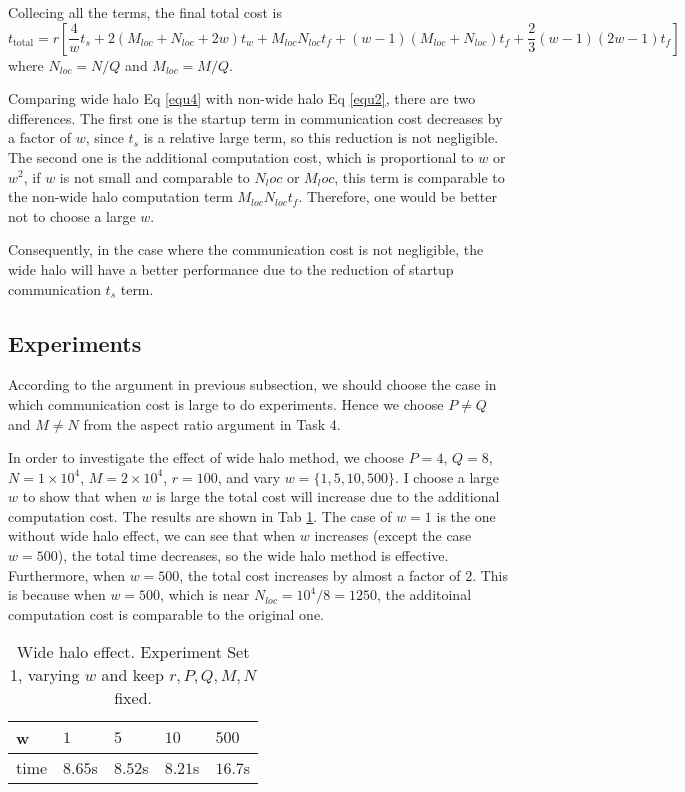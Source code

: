 Collecing all the terms, the final total cost is
\begin{equation} \label{equ4}
	t_{\textrm{total}} = r \left[ 
		\frac{4}{w} t_s + 2 \left( M_{loc} + N_{loc} + 2 w \right) t_w +
		M_{loc} N_{loc} t_f + (w-1) (M_{loc}+N_{loc}) t_f + \frac{2}{3}(w-1) (2w-1) t_f
		\right]
\end{equation}
where $N_{loc} = N/Q$ and $M_{loc} = M/Q$.

Comparing wide halo Eq \ref{equ4} with non-wide halo Eq \ref{equ2}, there are two differences.
The first one is the startup term in communication cost decreases by a factor of $w$, since $t_s$ is
a relative large term, so this reduction is not negligible. The second one is the additional computation
cost, which is proportional to $w$ or $w^2$, if $w$ is not small and comparable to $N_loc$ or $M_loc$,
this term is comparable to the non-wide halo computation term $M_{loc} N_{loc} t_f$. Therefore, one 
would be better not to choose a large $w$.

Consequently, in the case where the communication cost is not negligible, the wide halo will have 
a better performance due to the reduction of startup communication $t_s$ term.

\subsection{Experiments}
According to the argument in previous subsection, we should choose the case in which communication cost
is large to do experiments.
Hence we choose $P\neq Q$ and $M\neq N$ from the aspect ratio argument in Task 4. 

In order to investigate the effect of wide halo method, we choose $P=4$, $Q=8$, $N=1\times10^4$, $M=2\times10^4$, 
$r=100$, and vary $w = \{1,5,10,500\}$.  
I choose a large $w$ to show that when $w$ is large the total cost will increase due to the additional computation cost.
The results are shown in Tab \ref{tab7}. The case of $w=1$ is the one without wide halo effect, we can 
see that when $w$ increases (except the case $w=500$), the total time decreases, so the wide halo method is effective. 
Furthermore, when $w=500$, the total cost increases by almost a factor of $2$. This is because when $w=500$, which
is near $N_{loc} = 10^4/8 = 1250$, the additoinal computation cost is comparable to the original one.

\begin{table}[h]
	\centering
	\caption{Wide halo effect. Experiment Set 1, varying $w$ and keep $r, P, Q, M, N$ fixed.}
	\label{tab7}
	\begin{tabular}{lllll}
		\hline
		w               & $1$ & $5$ & $10$ & $500$ \\ \hline
		time            & $8.65$s & $8.52$s & $8.21$s & $16.7$s  \\ \hline
	\end{tabular}
\end{table}

